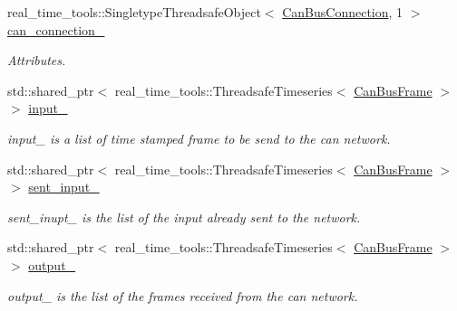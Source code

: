 \begin{DoxyCompactItemize}
\item 
real\+\_\+time\+\_\+tools\+::\+Singletype\+Threadsafe\+Object$<$ \hyperlink{classblmc__drivers_1_1CanBusConnection}{Can\+Bus\+Connection}, 1 $>$ \hyperlink{classblmc__drivers_1_1CanBus_a996c9b1bc46071b2d002de38d6e9f781}{can\+\_\+connection\+\_\+}
\begin{DoxyCompactList}\small\item\em Attributes. \end{DoxyCompactList}\item 
\mbox{\label{classblmc__drivers_1_1CanBus_ab09707f2c5f6cb7eb98f82e8e190d3c4}} 
std\+::shared\+\_\+ptr$<$ real\+\_\+time\+\_\+tools\+::\+Threadsafe\+Timeseries$<$ \hyperlink{classblmc__drivers_1_1CanBusFrame}{Can\+Bus\+Frame} $>$ $>$ \hyperlink{classblmc__drivers_1_1CanBus_ab09707f2c5f6cb7eb98f82e8e190d3c4}{input\+\_\+}
\begin{DoxyCompactList}\small\item\em input\+\_\+ is a list of time stamped frame to be send to the can network. \end{DoxyCompactList}\item 
\mbox{\label{classblmc__drivers_1_1CanBus_ae1ecf491b819c83eb999bb9cdde6fb21}} 
std\+::shared\+\_\+ptr$<$ real\+\_\+time\+\_\+tools\+::\+Threadsafe\+Timeseries$<$ \hyperlink{classblmc__drivers_1_1CanBusFrame}{Can\+Bus\+Frame} $>$ $>$ \hyperlink{classblmc__drivers_1_1CanBus_ae1ecf491b819c83eb999bb9cdde6fb21}{sent\+\_\+input\+\_\+}
\begin{DoxyCompactList}\small\item\em sent\+\_\+inupt\+\_\+ is the list of the input already sent to the network. \end{DoxyCompactList}\item 
\mbox{\label{classblmc__drivers_1_1CanBus_ad9802d502698f202f9842a0c00372931}} 
std\+::shared\+\_\+ptr$<$ real\+\_\+time\+\_\+tools\+::\+Threadsafe\+Timeseries$<$ \hyperlink{classblmc__drivers_1_1CanBusFrame}{Can\+Bus\+Frame} $>$ $>$ \hyperlink{classblmc__drivers_1_1CanBus_ad9802d502698f202f9842a0c00372931}{output\+\_\+}
\begin{DoxyCompactList}\small\item\em output\+\_\+ is the list of the frames received from the can network. \end{DoxyCompactList}\item 

\end{DoxyCompactItemize}
